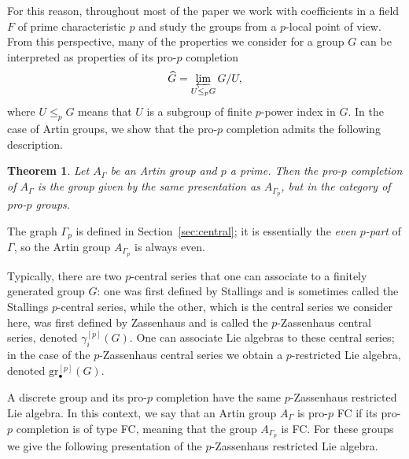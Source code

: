 \documentclass[10pt, oneside]{amsart}
\theoremstyle{definition}
\theoremstyle{remark}
\theoremstyle{plain}
\newtheorem{teoInt}{Theorem}
\begin{document}
For this reason, throughout most of the paper we work with coefficients in a field \(F\) of prime characteristic \(p\) and study the groups from a \(p\)-local point of view. From this perspective, many of the properties we consider for a group \(G\) can be interpreted as properties of its pro-\(p\) completion
\[
\widehat{G}=\varprojlim_{U\leq_p G} G/U,
\]
where \(U\leq_p G\) means that \(U\) is a subgroup of finite \(p\)-power index in \(G\). In the case of Artin groups, we show that the pro-\(p\) completion admits the following description.


\begin{teoInt}\label{teo:prop}
{\sl Let $A_\Gamma$ be an Artin group and $p$ a prime. Then the pro-$p$ completion of $A_\Gamma$ is the group given by the same presentation as $A_{\Gamma_p}$, but in the category of pro-$p$ groups.}
\end{teoInt}

The graph $\Gamma_p$ is defined in Section~\ref{sec:central}; it is essentially the {\sl even $p$-part} of $\Gamma$, so the Artin group $A_{\Gamma_p}$ is always even.

Typically, there are two $p$-central series that one can associate to a finitely generated group $G$: one was first defined by Stallings and is sometimes called the Stallings $p$-central series, while the other, which is the central series we consider here, was first defined by Zassenhaus and is called the $p$-Zassenhaus central series, denoted $\gamma_i^{[p]}(G)$. One can associate Lie algebras to these central series; in the case of the $p$-Zassenhaus central series we obtain a $p$-restricted Lie algebra, denoted $\mathrm{gr}_\bullet^{[p]}(G)$.

A discrete group and its pro-$p$ completion have the same $p$-Zassenhaus restricted Lie algebra. In this context, we say that an Artin group $A_\Gamma$ is pro-$p$ FC if its pro-$p$ completion is of type FC, meaning that the group $A_{\Gamma_p}$ is FC. For these groups we give the following presentation of the $p$-Zassenhaus restricted Lie algebra.
\end{document}
